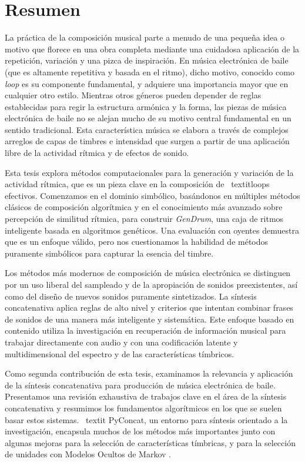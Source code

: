 
\chapter{Resumen}

La práctica de la composición musical parte a menudo de una pequeña idea o motivo que florece en una obra completa mediante una cuidadosa aplicación de la repetición, variación y una pizca de inspiración. En música electrónica de baile (que es altamente repetitiva y basada en el ritmo), dicho motivo, conocido como \textit {loop} es su componente fundamental, y adquiere una importancia mayor que en cualquier otro estilo. Mientras otros géneros pueden depender de reglas establecidas para regir la estructura armónica y la forma, las piezas de música electrónica de baile no se alejan mucho de su motivo central fundamental en un sentido tradicional. Esta característica música se elabora a través de complejos arreglos de capas de timbres e intensidad que surgen a partir de una aplicación libre de la actividad rítmica y de efectos de sonido.

Esta tesis explora métodos computacionales para la generación y variación de la actividad rítmica, que es un pieza clave en la composición de \ textit{loops} efectivos. Comenzamos en el dominio simbólico, basándonos en múltiples métodos clásicos de composición algorítmica y en el conocimiento más avanzado sobre percepción de similitud rítmica, para construir \textit{GenDrum}, una caja de ritmos inteligente basada en algoritmos genéticos. Una evaluación con oyentes demuestra que es un enfoque válido, pero nos cuestionamos la habilidad de métodos puramente simbólicos para capturar la esencia del timbre.

Los métodos más modernos de composición de música electrónica se distinguen por un uso liberal del sampleado y de la apropiación de sonidos preexistentes, así como del diseño de nuevos sonidos puramente sintetizados. La síntesis concatenativa aplica reglas de alto nivel y criterios que intentan combinar frases de sonidos de una manera más inteligente y sistemática. Este enfoque basado en contenido utiliza la investigación en recuperación de información musical para trabajar directamente con audio y con una codificación latente y multidimensional del espectro y de las características tímbricos.

Como segunda contribución de esta tesis, examinamos la relevancia y aplicación de la síntesis concatenativa para producción de música electrónica de baile. Presentamos una revisión exhaustiva de trabajos clave en el área de la síntesis concatenativa y resumimos los fundamentos algorítmicos en los que se suelen basar estos sistemas. \ textit {PyConcat}, un entorno para síntesis orientado a la investigación, encapsula muchos de los métodos más importantes junto con algunas mejoras para la selección de características tímbricas, y para la selección de unidades con Modelos Ocultos de Markov .

